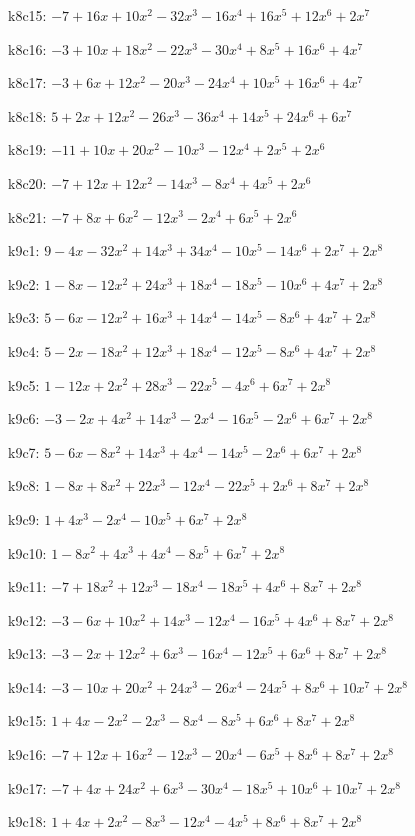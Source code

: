 k8c15: $ -7+16x+10x^{2}-32x^{3}-16x^{4}+16x^{5}+12x^{6}+2x^{7} $ 

k8c16: $ -3+10x+18x^{2}-22x^{3}-30x^{4}+8x^{5}+16x^{6}+4x^{7} $ 

k8c17: $ -3+6x+12x^{2}-20x^{3}-24x^{4}+10x^{5}+16x^{6}+4x^{7} $ 

k8c18: $ 5+2x+12x^{2}-26x^{3}-36x^{4}+14x^{5}+24x^{6}+6x^{7} $ 

k8c19: $ -11+10x+20x^{2}-10x^{3}-12x^{4}+2x^{5}+2x^{6} $ 

k8c20: $ -7+12x+12x^{2}-14x^{3}-8x^{4}+4x^{5}+2x^{6} $ 

k8c21: $ -7+8x+6x^{2}-12x^{3}-2x^{4}+6x^{5}+2x^{6} $ 

k9c1: $ 9-4x-32x^{2}+14x^{3}+34x^{4}-10x^{5}-14x^{6}+2x^{7}+2x^{8} $ 

k9c2: $ 1-8x-12x^{2}+24x^{3}+18x^{4}-18x^{5}-10x^{6}+4x^{7}+2x^{8} $ 

k9c3: $ 5-6x-12x^{2}+16x^{3}+14x^{4}-14x^{5}-8x^{6}+4x^{7}+2x^{8} $ 

k9c4: $ 5-2x-18x^{2}+12x^{3}+18x^{4}-12x^{5}-8x^{6}+4x^{7}+2x^{8} $ 

k9c5: $ 1-12x+2x^{2}+28x^{3}-22x^{5}-4x^{6}+6x^{7}+2x^{8} $ 

k9c6: $ -3-2x+4x^{2}+14x^{3}-2x^{4}-16x^{5}-2x^{6}+6x^{7}+2x^{8} $ 

k9c7: $ 5-6x-8x^{2}+14x^{3}+4x^{4}-14x^{5}-2x^{6}+6x^{7}+2x^{8} $ 

k9c8: $ 1-8x+8x^{2}+22x^{3}-12x^{4}-22x^{5}+2x^{6}+8x^{7}+2x^{8} $ 

k9c9: $ 1+4x^{3}-2x^{4}-10x^{5}+6x^{7}+2x^{8} $ 

k9c10: $ 1-8x^{2}+4x^{3}+4x^{4}-8x^{5}+6x^{7}+2x^{8} $ 

k9c11: $ -7+18x^{2}+12x^{3}-18x^{4}-18x^{5}+4x^{6}+8x^{7}+2x^{8} $ 

k9c12: $ -3-6x+10x^{2}+14x^{3}-12x^{4}-16x^{5}+4x^{6}+8x^{7}+2x^{8} $ 

k9c13: $ -3-2x+12x^{2}+6x^{3}-16x^{4}-12x^{5}+6x^{6}+8x^{7}+2x^{8} $ 

k9c14: $ -3-10x+20x^{2}+24x^{3}-26x^{4}-24x^{5}+8x^{6}+10x^{7}+2x^{8} $ 

k9c15: $ 1+4x-2x^{2}-2x^{3}-8x^{4}-8x^{5}+6x^{6}+8x^{7}+2x^{8} $ 

k9c16: $ -7+12x+16x^{2}-12x^{3}-20x^{4}-6x^{5}+8x^{6}+8x^{7}+2x^{8} $ 

k9c17: $ -7+4x+24x^{2}+6x^{3}-30x^{4}-18x^{5}+10x^{6}+10x^{7}+2x^{8} $ 

k9c18: $ 1+4x+2x^{2}-8x^{3}-12x^{4}-4x^{5}+8x^{6}+8x^{7}+2x^{8} $ 

